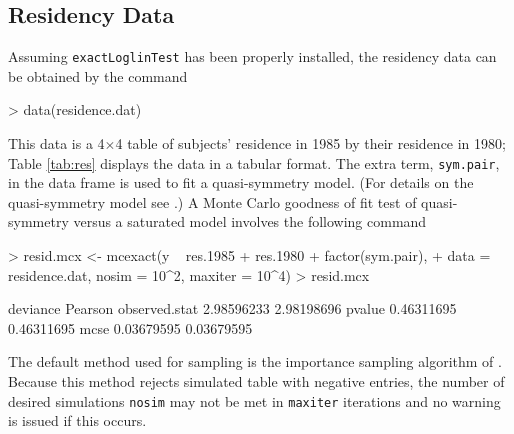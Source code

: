 \documentclass[a4paper]{article}
\begin{document}
\subsection{Residency Data}
Assuming \texttt{exactLoglinTest} has been properly installed, the residency data can
be obtained by the command
\begin{Schunk}
\begin{Sinput}
> data(residence.dat)
\end{Sinput}
\end{Schunk}
This data is a 4$\times$4 table of subjects' residence in 1985 by
their residence in 1980; Table \ref{tab:res} displays the data in a
tabular format.  The extra term, \texttt{sym.pair}, in the data frame
is used to fit a quasi-symmetry model. (For details on the
quasi-symmetry model see \cite{agre:1990}.)  A Monte Carlo goodness of
fit test of quasi-symmetry versus a saturated model involves the
following command
\begin{Schunk}
\begin{Sinput}
> resid.mcx <- mcexact(y ~ res.1985 + res.1980 + factor(sym.pair), 
+     data = residence.dat, nosim = 10^2, maxiter = 10^4)
> resid.mcx
\end{Sinput}
\begin{Soutput}
                deviance    Pearson
observed.stat 2.98596233 2.98198696
pvalue        0.46311695 0.46311695
mcse          0.03679595 0.03679595
\end{Soutput}
\end{Schunk}

The default method used for sampling is the importance sampling
algorithm of \cite{booth:butler:1999}. Because this method rejects
simulated table with negative entries, the number of desired
simulations \texttt{nosim} may not be met in \texttt{maxiter}
iterations and no warning is issued if this occurs. 
\end{document}
